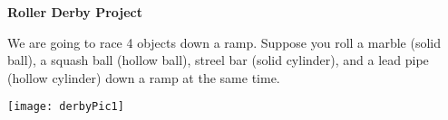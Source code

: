 \documentclass[11pt]{article}
\begin{document}

\thispagestyle{plain} %


\vspace{0.3cm} %

\begin{center}
{\bf Roller Derby Project}\\
\end{center}

\vspace{0.1cm}

\begin{multicols}{2}\noindent We are going to race 4 objects down a ramp. Suppose you roll a marble (solid ball), a squash ball (hollow ball), streel bar (solid cylinder), and a lead pipe (hollow cylinder) down a ramp at the same time.

\columnbreak
\texttt{[image: derbyPic1]}
\end{multicols}
\end{document}

